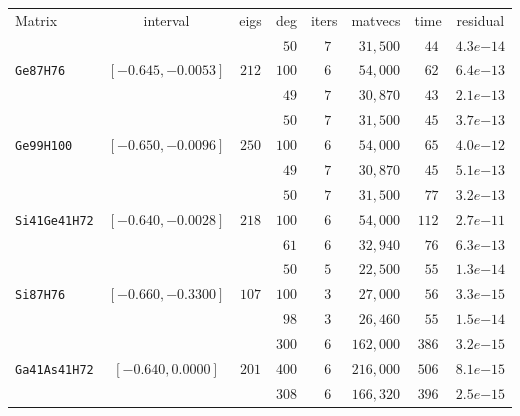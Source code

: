 \begin{tabular}{l|c|c|c|c|c|c|c}
\hline
\multirow{2}{*}{Matrix} & \multirow{2}{*}{interval} & \multirow{2}{*}{eigs} & \multirow{2}{*}{deg} & \multirow{2}{*}{iters} & \multirow{2}{*}{matvecs} & \multirow{2}{*}{time} & \multirow{2}{*}{residual} \\
 & & & & & & & \\\hline
\hline
 & & & $\phantom{0}50$ & $\phantom{0}7$ & $\phantom{0}31,500$ & $\phantom{0}44$ & $4.3e{-14}$ \\
\verb|Ge87H76| & $[-0.645,-0.0053]$ & $212$ & $100$ & $\phantom{0}6$ & $\phantom{0}54,000$ & $\phantom{0}62$ & $6.4e{-13}$ \\
 & & & $\phantom{0}49$ & $\phantom{0}7$ & $\phantom{0}30,870$ & $\phantom{0}43$ & $2.1e{-13}$ \\\hline
 & & & $\phantom{0}50$ & $\phantom{0}7$ & $\phantom{0}31,500$ & $\phantom{0}45$ & $3.7e{-13}$ \\
\verb|Ge99H100| & $[-0.650,-0.0096]$ & $250$ & $100$ & $\phantom{0}6$ & $\phantom{0}54,000$ & $\phantom{0}65$ & $4.0e{-12}$ \\
 & & & $\phantom{0}49$ & $\phantom{0}7$ & $\phantom{0}30,870$ & $\phantom{0}45$ & $5.1e{-13}$ \\\hline
 & & & $\phantom{0}50$ & $\phantom{0}7$ & $\phantom{0}31,500$ & $\phantom{0}77$ & $3.2e{-13}$ \\
\verb|Si41Ge41H72| & $[-0.640,-0.0028]$ & $218$ & $100$ & $\phantom{0}6$ & $\phantom{0}54,000$ & $112$ & $2.7e{-11}$ \\
 & & & $\phantom{0}61$ & $\phantom{0}6$ & $\phantom{0}32,940$ & $\phantom{0}76$ & $6.3e{-13}$ \\\hline
 & & & $\phantom{0}50$ & $\phantom{0}5$ & $\phantom{0}22,500$ & $\phantom{0}55$ & $1.3e{-14}$ \\
\verb|Si87H76| & $[-0.660,-0.3300]$ & $107$ & $100$ & $\phantom{0}3$ & $\phantom{0}27,000$ & $\phantom{0}56$ & $3.3e{-15}$ \\
 & & & $\phantom{0}98$ & $\phantom{0}3$ & $\phantom{0}26,460$ & $\phantom{0}55$ & $1.5e{-14}$ \\\hline
 & & & $300$ & $\phantom{0}6$ & $162,000$ & $386$ & $3.2e{-15}$ \\
\verb|Ga41As41H72| & $[-0.640,0.0000]$ & $201$ & $400$ & $\phantom{0}6$ & $216,000$ & $506$ & $8.1e{-15}$ \\
 & & & $308$ & $\phantom{0}6$ & $166,320$ & $396$ & $2.5e{-15}$ \\\hline
\end{tabular}